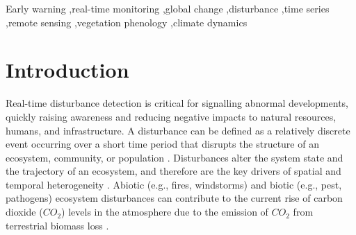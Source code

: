 \documentclass[authoryear,preprint,review,10pt]{elsarticle}
\begin{document}
\begin{frontmatter}
\begin{keyword}
Early warning \sep real-time monitoring \sep global change \sep disturbance \sep time series \sep remote sensing \sep vegetation phenology \sep climate dynamics
\end{keyword}

\end{frontmatter}



\section{Introduction}


Real-time disturbance detection is critical for signalling abnormal developments, quickly raising awareness and reducing negative impacts to natural resources, humans, and infrastructure. A disturbance can be defined as a relatively discrete event occurring over a short time period that disrupts the structure of an ecosystem, community, or population \citep{Pickett:1986td}. Disturbances alter the system state and the trajectory of an ecosystem, and therefore are the key drivers of spatial and temporal heterogeneity \citep{Turner:2010wo}. Abiotic (e.g., fires, windstorms) and biotic (e.g., pest, pathogens) ecosystem disturbances can contribute to the current rise of carbon dioxide ($CO_2$) levels in the atmosphere due to the emission of $CO_2$ from terrestrial biomass loss \citep{Potter2003,Schimel:2001vi}. 


\end{document}
